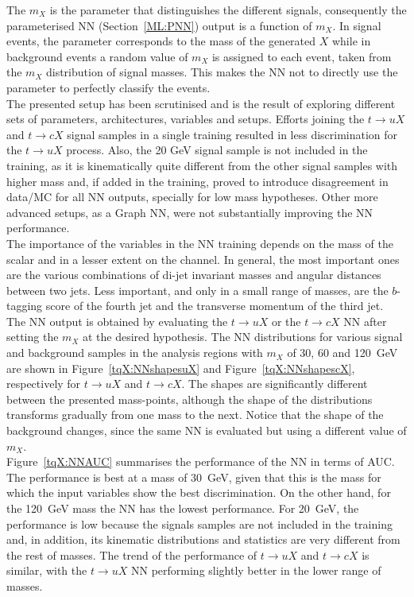 The $m_X$ is the parameter that distinguishes the different signals, consequently the parameterised NN (Section~\ref{ML:PNN}) output is a function of $m_X$. In signal events, the parameter corresponds to the mass of the generated $X$ while in background events a random value of $m_X$ is assigned to each event, taken from the $m_X$ distribution of signal masses. This makes the NN not to directly use the parameter to perfectly classify the events.\\

The presented setup has been scrutinised and is the result of exploring different sets of parameters, architectures, variables and setups. Efforts joining the $t\to uX$ and $t\to cX$ signal samples in a single training resulted in less discrimination for the $t\to uX$ process. Also, the 20 GeV signal sample is not included in the training, as it is kinematically quite different from the other signal samples with higher mass and, if added in the training, proved to introduce disagreement in data/MC for all NN outputs, specially for low mass hypotheses. Other more advanced setups, as a Graph NN, were not substantially improving the NN performance.\\

The importance of the variables in the NN training depends on the mass of the scalar and in a lesser extent on the channel. In general, the most important ones are the various combinations of di-jet invariant masses and angular distances between two jets. Less important, and only in a small range of masses, are the $b$-tagging score of the fourth jet and the transverse momentum of the third jet.\\

The NN output is obtained by evaluating the $t\to uX$ or the $t\to cX$ NN after setting the $m_X$ at the desired hypothesis. The NN distributions for various signal and background samples in the analysis regions with $m_X$ of 30, 60 and 120~GeV are shown in Figure~\ref{tqX:NNshapesuX} and Figure~\ref{tqX:NNshapescX}, respectively for $t\to uX$ and $t\to cX$. The shapes are significantly different between the presented mass-points, although the shape of the distributions transforms gradually from one mass to the next. Notice that the shape of the background changes, since the same NN is evaluated but using a different value of $m_X$.\\

Figure~\ref{tqX:NNAUC} summarises the performance of the NN in terms of AUC. The performance is best at a mass of 30~GeV, given that this is the mass for which the input variables show the best discrimination. On the other hand, for the 120~GeV mass the NN has the lowest performance. For 20~GeV, the performance is low because the signals samples are not included in the training and, in addition, its kinematic distributions and statistics are very different from the rest of masses. The trend of the performance of $t\to uX$ and $t\to cX$ is similar, with the $t\to uX$ NN performing slightly better in the lower range of masses.\\

